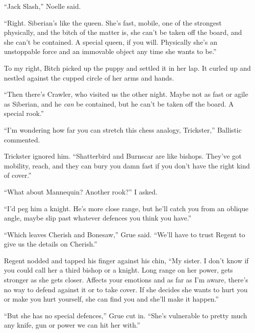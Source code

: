 ``Jack Slash,'' Noelle said.



``Right.  Siberian's like the queen.  She's fast, mobile, one of the strongest physically, and the bitch of the matter is, she can't be taken off the board, and she can't be contained.  A special queen, if you will.  Physically she's an unstoppable force and an immovable object any time she wants to be.''



To my right, Bitch picked up the puppy and settled it in her lap.  It curled up and nestled against the cupped circle of her arms and hands.



``Then there's Crawler, who visited us the other night.  Maybe not as fast or agile as Siberian, and he \emph{can} be contained, but he can't be taken off the board.  A special rook.''



``I'm wondering how far you can stretch this chess analogy, Trickster,'' Ballistic commented.



Trickster ignored him.  ``Shatterbird and Burnscar are like bishops.  They've got mobility, reach, and they can bury you damn fast if you don't have the right kind of cover.''



``What about Mannequin?  Another rook?''  I asked.



``I'd peg him a knight.  He's more close range, but he'll catch you from an oblique angle, maybe slip past whatever defences you think you have.''



``Which leaves Cherish and Bonesaw,'' Grue said.  ``We'll have to trust Regent to give us the details on Cherish.''



Regent nodded and tapped his finger against his chin, ``My sister.  I don't know if you could call her a third bishop or a knight.  Long range on her power, gets stronger as she gets closer.  Affects your emotions and as far as I'm aware, there's no way to defend against it or to take cover.  If she decides she wants to hurt you or make you hurt yourself, she can find you and she'll make it happen.''



``But she has no special defences,'' Grue cut in.  ``She's vulnerable to pretty much any knife, gun or power we can hit her with.''



